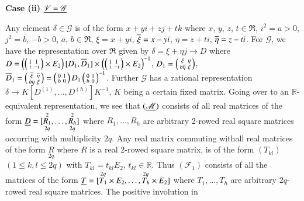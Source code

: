 \medskip
\noindent
{\rm \bf{Case} (ii)} $\underline{\mathscr{V} = \mathscr{G}}$

Any element $\delta\in\mathscr{G}$ is of the form $x+yi+zj+tk$ where
$x$, $y$, $z$, $t\in\mathfrak{R}$, $i^{2}=a>0$, $j^{2}=b$, $-b>0$,
$a$, $b\in \mathfrak{R}$, $\xi=x+yi$, $\overline{\xi}=x-yi$, $\eta=z+ti$,
$\overline{\eta}=z-ti$. For $\mathscr{G}$, we have the representation  over
$\mathfrak{R}$ given by $\delta=\xi+\eta j\to D$ where
$D=\left(\left(\begin{smallmatrix} 1 & 1\\ i & -i 
\end{smallmatrix}\right)\times E_{2}\right)[D_{1},\overline{D}_{1}]\times
\left(\left(\begin{smallmatrix} 1 & 1 \\ i & -i
\end{smallmatrix}\right)\times E_{2}\right)^{-1}$,
$D_{1}=\left(\begin{smallmatrix} \xi & \eta\\ b\overline{\eta} & \xi 
\end{smallmatrix}\right)$, $\overline{D}_{1}=\left(\begin{smallmatrix}
  \overline{\xi} & \overline{\eta}\\ b\eta &
  \xi \end{smallmatrix}\right)=\left(\begin{smallmatrix} 0 & 1\\ b & 0
\end{smallmatrix}\right)D_{1}\left(\begin{smallmatrix} 0 & 1\\ b & 0
\end{smallmatrix}\right)^{-1}$. Further $\mathscr{G}$ has a rational
representation $\delta\to K[D^{(1)},\ldots,D^{(h)}]K^{-1}$, $K$ being
a certain fixed matrix. Going over to an $\mathbb{R}$-equivalent
representation, we see that $(\underline{\mathscr{M}})$ consists of all real
matrices of the form
$\underline{D}=[\overset{2}{\underset{2q}{R_{1}}},
  \ldots,\overset{2}{\underset{2q}{R_{h}}}]$  
where $R_{1},\ldots,R_{h}$ are arbitrary 2-rowed real square
matrices occurring with multiplicity $2q$. Any real matrix commuting
with\pageoriginale all real matrices of the form $\underset{2q}{R}$
where $R$ is a real 2-rowed square matrix, is of the form $(T_{kl})$
$(1\leq k,l\leq 2q)$ with $T_{kl}=t_{kl}E_{2}$,
$t_{kl}\in\mathbb{R}$. Thus $(\mathscr{F}_{1})$ consists of all the
matrices of the form $\underline{T}= [\overset{2q}{T_{1}}\times E_{2},\ldots,
  \overset{2q}{T_{h}}\times E_{2}]$ where $T_{1},\ldots,T_{h}$ are
arbitrary $2q$-rowed real square matrices. The positive involution in
